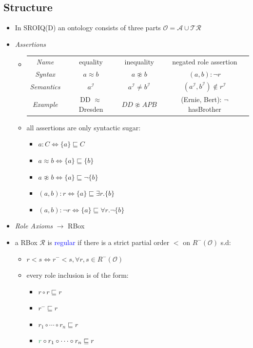 \documentclass[12pt,a4paper]{article}
\newcommand{\blue}[1]{\textcolor{blue} {#1}}
\newcommand{\green}[1]{\textcolor{ForestGreen} {#1}}
\newcommand{\ont}{\mathcal{O}}
\newcommand{\ip}{^\mathcal{I}}
\newcommand{\sse}{\sqsubseteq}
\begin{document}
\subsection{Structure}
\begin{itemize}
\item In SROIQ(D) an ontology consists of three parts $\ont = \mathcal{A} \cup \mathcal{T} \mathcal{R}$
\item \textit{Assertions}
\begin{itemize}
\item \begin{tabular}{c c c c}
\textit{Name} & equality & inequality & negated role assertion\\
\textit{Syntax} & $a\approx b$ & $a \not\approx b$ & $(a,b):\neg r$\\
\textit{Semantics} & $a\ip$ & $a\ip \neq b\ip$ & $(a\ip,b\ip)\not\in r\ip$\\
\textit{Example} & DD $\approx$ Dresden & $DD\not\approx APB$ & (Ernie, Bert): $\neg$ hasBrother
\end{tabular}
\item all assertions are only syntactic sugar:
\begin{itemize}
\item $a:C \Leftrightarrow \{a\} \sse C$ 
\item $a\approx b \Leftrightarrow \{a\} \sse \{b\}$
\item $a\not\approx b \Leftrightarrow \{a\}\sse \neg \{b\}$
\item $(a,b):r \Leftrightarrow \{a\} \sse \exists r.\{b\}$
\item $(a,b):\neg r \Leftrightarrow \{a\} \sse \forall r.\neg \{b\}$
\end{itemize}
\end{itemize}
\item \textit{Role Axioms} $\rightarrow$ RBox
\item a RBox $\mathcal{R}$ is \blue{regular} if there is a strict partial order $<$ on $R^-(\ont)$ s.d:
\begin{itemize}
\item $r<s \Leftrightarrow r^- < s, \forall r,s \in R^-(\ont)$
\item every role inclusion is of the form:
\begin{itemize}
\item $r\circ r \sse r$
\item $r^- \sse r$
\item $r_1 \circ\cdots\circ r_n \sse r$
\item $\green{r}\circ r_1\circ\cdots\circ r_n \sse r$

\end{itemize}
\end{itemize}
\end{itemize}
\end{document}
